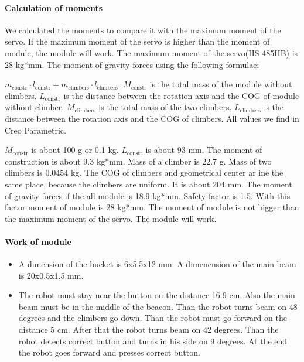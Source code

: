 	\paragraph{Calculation of moments}
	
	We calculated the moments to compare it with the maximum moment of the servo. If the maximum moment of the servo is higher than the moment of module, the module will work. The maximum moment of the servo(HS-485HB) is 28 kg*mm. The moment of gravity forces using the following formulae: 
	
	$m_\text{constr} \cdot l_\text{constr} + m_\text{climbers} \cdot l_\text{climbers}$.	
	 $M_\text{constr}$ is the total mass of the module without climbers. $L_\text{constr}$ is the distance between the rotation axis and the COG of module without climber. $M_\text{climbers}$ is the total mass of the two climbers. $L_\text{climbers}$ is the distance between the rotation axis and the COG of climbers. All values we find in Creo Parametric.
	 
	 $M_\text{constr}$ is about 100 g or 0.1 kg. $L_\text{constr}$ is about 93 mm. The moment of construction is about 9.3 kg*mm. Mass of a climber is 22.7 g. Mass of two climbers is 0.0454 kg. The COG of climbers and geometrical center ar ine the same place, because the climbers are uniform. It is about 204 mm. The moment of gravity forces if the all module is 18.9 kg*mm. Safety factor is 1.5. With this factor moment of module is 28 kg*mm. The moment of module is not bigger than the maximum moment of the servo. The module will work.
	 
	 \paragraph{Work of module}
	 
	 \begin{itemize}
	 
		 \item A dimension of the bucket is 6x5.5x12 mm. A dimenension of the main beam is 20x0.5x1.5 mm.
	 
		 \item The robot must stay near the button on the distance 16.9 cm. Also the main beam must be in the middle of the beacon. Than the robot turns beam on 48 degrees and the climbers go down. Than the robot must go forward on the distance 5 cm. After that the robot turns beam on 42 degrees. Than the robot detects correct button and turns in his side on 9 degrees. At the end the robot goes forward and presses correct button.
	\end{itemize}
	\fillpage